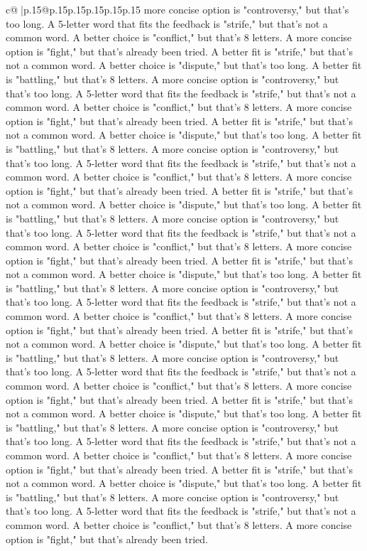 \documentclass{article}
\begin{document}
{\begin{supertabular}{c@{$\;$}|p{.15\linewidth}@{}p{.15\linewidth}p{.15\linewidth}p{.15\linewidth}p{.15\linewidth}p{.15\linewidth}}
{{{more concise option is "controversy," but that's too long. A 5{-}letter word that fits the feedback is "strife," but that's not a common word. A better choice is "conflict," but that's 8 letters. A more concise option is "fight," but that's already been tried. A better fit is "strife," but that's not a common word. A better choice is "dispute," but that's too long. A better fit is "battling," but that's 8 letters. A more concise option is "controversy," but that's too long. A 5{-}letter word that fits the feedback is "strife," but that's not a common word. A better choice is "conflict," but that's 8 letters. A more concise option is "fight," but that's already been tried. A better fit is "strife," but that's not a common word. A better choice is "dispute," but that's too long. A better fit is "battling," but that's 8 letters. A more concise option is "controversy," but that's too long. A 5{-}letter word that fits the feedback is "strife," but that's not a common word. A better choice is "conflict," but that's 8 letters. A more concise option is "fight," but that's already been tried. A better fit is "strife," but that's not a common word. A better choice is "dispute," but that's too long. A better fit is "battling," but that's 8 letters. A more concise option is "controversy," but that's too long. A 5{-}letter word that fits the feedback is "strife," but that's not a common word. A better choice is "conflict," but that's 8 letters. A more concise option is "fight," but that's already been tried. A better fit is "strife," but that's not a common word. A better choice is "dispute," but that's too long. A better fit is "battling," but that's 8 letters. A more concise option is "controversy," but that's too long. A 5{-}letter word that fits the feedback is "strife," but that's not a common word. A better choice is "conflict," but that's 8 letters. A more concise option is "fight," but that's already been tried. A better fit is "strife," but that's not a common word. A better choice is "dispute," but that's too long. A better fit is "battling," but that's 8 letters. A more concise option is "controversy," but that's too long. A 5{-}letter word that fits the feedback is "strife," but that's not a common word. A better choice is "conflict," but that's 8 letters. A more concise option is "fight," but that's already been tried. A better fit is "strife," but that's not a common word. A better choice is "dispute," but that's too long. A better fit is "battling," but that's 8 letters. A more concise option is "controversy," but that's too long. A 5{-}letter word that fits the feedback is "strife," but that's not a common word. A better choice is "conflict," but that's 8 letters. A more concise option is "fight," but that's already been tried. A better fit is "strife," but that's not a common word. A better choice is "dispute," but that's too long. A better fit is "battling," but that's 8 letters. A more concise option is "controversy," but that's too long. A 5{-}letter word that fits the feedback is "strife," but that's not a common word. A better choice is "conflict," but that's 8 letters. A more concise option is "fight," but that's already been tried. }}}
\end{supertabular}}
\end{document}

